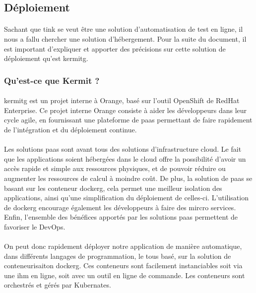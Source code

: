 \documentclass[12pt,a4paper]{report}
\begin{document}
\subsection{Déploiement}
\paragraph*{}Sachant que \gls{tink} se veut être une solution d'automatisation de test en ligne, il nous a fallu chercher une solution d'hébergement. Pour la suite du document, il est important d'expliquer et apporter des précisions sur cette solution de déploiement qu'est \gls{kermitg}. \\
\subsubsection{Qu'est-ce que Kermit ?}
\paragraph*{} \gls{kermitg} est un projet interne à Orange, basé sur l'outil OpenShift de RedHat Enterprise. Ce projet interne Orange consiste à aider les développeurs dans leur cycle agile, en fournissant une plateforme de \gls{paas} permettant de faire rapidement de l'intégration et du déploiement continue. 
\paragraph*{}Les solutions \gls{paas} sont avant tous des solutions d'infrastructure cloud. Le fait que les applications soient hébergées dans le cloud offre la possibilité d'avoir un accès rapide et simple aux ressources physiques, et de pouvoir réduire ou augmenter les ressources de calcul à moindre coût. De plus, la solution de \gls{paas} se basant sur les conteneur \gls{dockerg}, cela permet une meilleur isolation des applications, ainsi qu'une simplification du déploiement de celles-ci. L'utilisation de \gls{dockerg} encourage également les développeurs à faire des mircro services. Enfin, l'ensemble des bénéfices apportés par les solutions \gls{paas} permettent de favoriser le DevOps.
\paragraph*{}On peut donc rapidement déployer notre application de manière automatique, dans différents langages de programmation, le tous basé, sur la solution de conteneurisaiton \gls{dockerg}. Ces conteneurs sont facilement instanciables soit via une \gls{ihm} en ligne, soit avec un outil en ligne de commande. Les conteneurs sont orchestrés et gérés par Kubernates. \\
\end{document}
